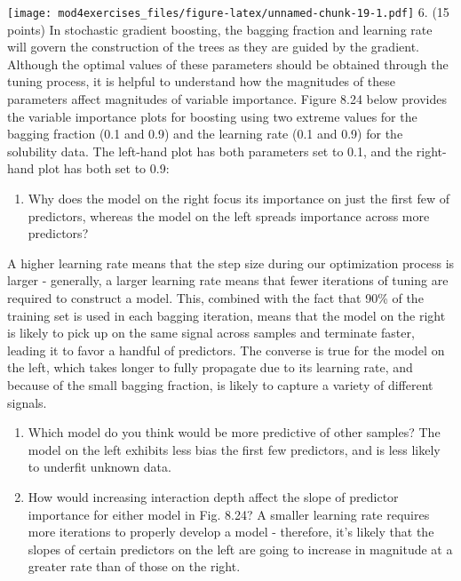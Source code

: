 \documentclass[
]{article}
\providecommand{\tightlist}{%
  \setlength{\itemsep}{0pt}\setlength{\parskip}{0pt}}
\begin{document}
\texttt{[image: mod4exercises\_files/figure-latex/unnamed-chunk-19-1.pdf]}
6. (15 points) In stochastic gradient boosting, the bagging fraction and
learning rate will govern the construction of the trees as they are
guided by the gradient. Although the optimal values of these parameters
should be obtained through the tuning process, it is helpful to
understand how the magnitudes of these parameters affect magnitudes of
variable importance. Figure 8.24 below provides the variable importance
plots for boosting using two extreme values for the bagging fraction
(0.1 and 0.9) and the learning rate (0.1 and 0.9) for the solubility
data. The left-hand plot has both parameters set to 0.1, and the
right-hand plot has both set to 0.9:

\begin{enumerate}
\def\labelenumi{(\alph{enumi})}
\tightlist
\item
  Why does the model on the right focus its importance on just the first
  few of predictors, whereas the model on the left spreads importance
  across more predictors?
\end{enumerate}

A higher learning rate means that the step size during our optimization
process is larger - generally, a larger learning rate means that fewer
iterations of tuning are required to construct a model. This, combined
with the fact that 90\% of the training set is used in each bagging
iteration, means that the model on the right is likely to pick up on the
same signal across samples and terminate faster, leading it to favor a
handful of predictors. The converse is true for the model on the left,
which takes longer to fully propagate due to its learning rate, and
because of the small bagging fraction, is likely to capture a variety of
different signals.

\begin{enumerate}
\def\labelenumi{(\alph{enumi})}
\setcounter{enumi}{1}
\item
  Which model do you think would be more predictive of other samples?
  The model on the left exhibits less bias the first few predictors, and
  is less likely to underfit unknown data.
\item
  How would increasing interaction depth affect the slope of predictor
  importance for either model in Fig. 8.24? A smaller learning rate
  requires more iterations to properly develop a model - therefore, it's
  likely that the slopes of certain predictors on the left are going to
  increase in magnitude at a greater rate than of those on the right.
\end{enumerate}
\end{document}
